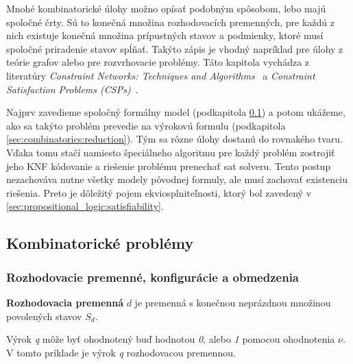 Mnohé kombinatorické úlohy možno opísať podobným spôsobom, lebo majú spoločné črty. Sú to konečná množina rozhodovacích premenných, pre každú z nich existuje konečná množina prípustných stavov a podmienky, ktoré musí spoločné priradenie stavov spĺňať. Takýto zápis je vhodný napríklad pre úlohy z teórie grafov alebo pre rozvrhovacie problémy. Táto kapitola vychádza z literatúry \textit{Constraint Networks: Techniques and Algorithms}~\cite{lecoutre2009} a \textit{Constraint Satisfaction Problems (CSPs)}~\cite{cs221csp}.

Najprv zavedieme spoločný formálny model (podkapitola \ref{sec:combinatorics:problems}) a potom ukážeme, ako sa takýto problém prevedie na výrokovú formulu (podkapitola \ref{sec:combinatorics:reduction}). Tým sa rôzne úlohy dostanú do rovnakého tvaru. Vďaka tomu stačí namiesto špeciálneho algoritmu pre každý problém zostrojiť jeho KNF kódovanie a riešenie problému prenechať \acrshort{sat} solveru. Tento postup nezachováva nutne všetky modely pôvodnej formuly, ale musí zachovať existenciu riešenia. Preto je dôležitý pojem ekviosplniteľnosti, ktorý bol zavedený v \ref{sec:propositional_logic:satisfiability}.


\subsection{Kombinatorické problémy}\label{sec:combinatorics:problems}

\subsubsection{Rozhodovacie premenné, konfigurácie a obmedzenia}\label{sec:combinatorics:variables-configurations-constraints}

\begin{definition}
    \textbf{Rozhodovacia premenná} $d$ je premenná s konečnou neprázdnou množinou povolených stavov $S_d$.
\end{definition}

\begin{example}
    Výrok \textit{q} môže byť ohodnotený buď hodnotou \textit{0}, alebo \textit{1} pomocou ohodnotenia $\nu$. V tomto príklade je výrok \textit{q} rozhodovacou premennou.
\end{example}

